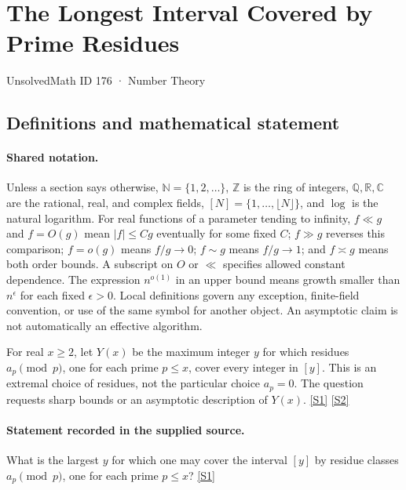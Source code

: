 \documentclass[11pt,a4paper]{article}
\newcommand{\N}{\mathbb{N}}
\newcommand{\Z}{\mathbb{Z}}
\newcommand{\Q}{\mathbb{Q}}
\newcommand{\R}{\mathbb{R}}
\newcommand{\C}{\mathbb{C}}
\newcommand{\sref}[2]{\hyperlink{source:#1:#2}{[S#2]}}
\begin{document}

\setcounter{section}{175}

\section{The Longest Interval Covered by Prime Residues}\label{176}

{\small\sffamily UnsolvedMath ID 176 · Number Theory}

\subsection{Definitions and mathematical statement}

\paragraph{Shared notation.}Unless a section says otherwise, $\N=\{1,2,\ldots\}$,
$\Z$ is the ring of integers, $\Q,\R,\C$ are the rational, real, and complex
fields, $[N]=\{1,\ldots,\lfloor N\rfloor\}$, and $\log$ is the natural
logarithm. For real functions of a parameter tending to infinity,
$f\ll g$ and $f=O(g)$ mean $|f|\leq Cg$ eventually for some fixed $C$;
$f\gg g$ reverses this comparison; $f=o(g)$ means $f/g\to0$;
$f\sim g$ means $f/g\to1$; and $f\asymp g$ means both order bounds.
A subscript on $O$ or $\ll$ specifies allowed constant dependence.
The expression $n^{o(1)}$ in an upper bound means growth smaller than
$n^\epsilon$ for each fixed $\epsilon>0$. Local definitions govern any
exception, finite-field convention, or use of the same symbol for another
object. An asymptotic claim is not automatically an effective algorithm.



For real $x\geq2$, let $Y(x)$ be the maximum integer $y$ for which residues $a_p\pmod p$, one for each prime $p\leq x$, cover every integer in $[y]$. This is an extremal choice of residues, not the particular choice $a_p=0$. The question requests sharp bounds or an asymptotic description of $Y(x)$. \sref{176}{1} \sref{176}{2}

\paragraph{Statement recorded in the supplied source.}
What is the largest $y$ for which one may cover the interval $[y]$ by residue classes $a_p \pmod p$, one for each prime $p \leq x$? \sref{176}{1}
\end{document}
